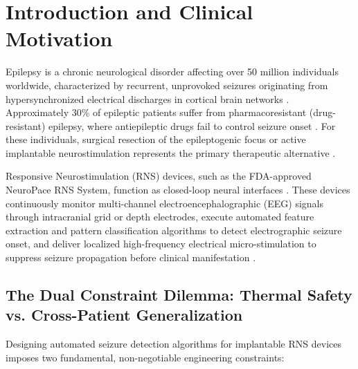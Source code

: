 \documentclass[pdflatex,sn-mathphys-num]{sn-jnl}%
\begin{document}

\maketitle

\section{Introduction and Clinical Motivation}\label{sec1}

Epilepsy is a chronic neurological disorder affecting over 50 million individuals worldwide, characterized by recurrent, unprovoked seizures originating from hypersynchronized electrical discharges in cortical brain networks \cite{gascoigne2023library, shoeb2010application}. Approximately 30\% of epileptic patients suffer from pharmacoresistant (drug-resistant) epilepsy, where antiepileptic drugs fail to control seizure onset \cite{zhang2025self}. For these individuals, surgical resection of the epileptogenic focus or active implantable neurostimulation represents the primary therapeutic alternative \cite{guttag2010chb}.

Responsive Neurostimulation (RNS) devices, such as the FDA-approved NeuroPace RNS System, function as closed-loop neural interfaces \cite{jeong2026deep}. These devices continuously monitor multi-channel electroencephalographic (EEG) signals through intracranial grid or depth electrodes, execute automated feature extraction and pattern classification algorithms to detect electrographic seizure onset, and deliver localized high-frequency electrical micro-stimulation to suppress seizure propagation before clinical manifestation \cite{xu2024eeg, gomez2020automatic}.

\subsection{The Dual Constraint Dilemma: Thermal Safety vs. Cross-Patient Generalization}

Designing automated seizure detection algorithms for implantable RNS devices imposes two fundamental, non-negotiable engineering constraints:
\end{document}
